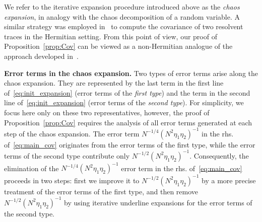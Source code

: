 \documentclass[10pt]{amsart}
\numberwithin{equation}{section}
\begin{document}
We refer to the iterative expansion procedure introduced above as the \emph{chaos expansion}, in analogy with the chaos decomposition of a random variable. A similar strategy was employed in~\cite[Theorem 2.1]{Knowles20} to compute the covariance of two resolvent traces in the Hermitian setting. From this point of view, our proof of Proposition~\ref{prop:Cov} can be viewed as a non-Hermitian analogue of the approach developed in~\cite{Knowles20}.

\smallskip

\textbf{Error terms in the chaos expansion.} Two types of error terms arise along the chaos expansion. They are represented by the last term in the first line of~\eqref{eq:init_expansion} (error terms of the \emph{first type}) and the term in the second line of~\eqref{eq:init_expansion} (error terms of the \emph{second type}). For simplicity, we focus here only on these two representatives, however, the proof of Proposition~\ref{prop:Cov} requires the analysis of all error terms generated at each step of the chaos expansion. The error term $N^{-1/4}(N^2\eta_1\eta_2)^{-1}$ in the rhs. of~\eqref{eq:main_cov} originates from the error terms of the first type, while the error terms of the second type contribute only $N^{-1/2}(N^2\eta_1\eta_2)^{-1}$. Consequently, the elimination of the $N^{-1/4}(N^2\eta_1\eta_2)^{-1}$ error term in the  rhs. of~\eqref{eq:main_cov} proceeds in two steps: first we improve it to $N^{-1/2}(N^2\eta_1\eta_2)^{-1}$ by a more precise treatment of the error terms of the first type, and then remove $N^{-1/2}(N^2\eta_1\eta_2)^{-1}$  by using iterative underline expansions for the error terms of the second type.
\end{document}

